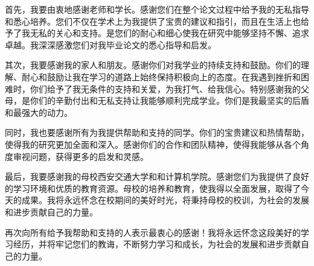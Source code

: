 \AcknowledgmentTitleCN

首先，我要由衷地感谢老师和学长。感谢您们在整个论文过程中给予我的无私指导和悉心培养。您们不仅在学术上为我提供了宝贵的建议和指引，而且在生活上也给予了我无私的关心和支持。是您们的耐心和细心使我在研究中能够坚持不懈、追求卓越。我深深感激您们对我毕业论文的悉心指导和启发。

其次，我要感谢我的家人和朋友。感谢你们对我学业的持续支持和鼓励。你们的理解、耐心和鼓励让我在学习的道路上始终保持积极向上的态度。在我遇到挫折和困难时，你们给予了我无条件的支持和关爱，为我打气、给我信心。特别感谢我的父母，是你们的辛勤付出和无私支持让我能够顺利完成学业。你们是我最坚实的后盾和最强大的动力。

同时，我也要感谢所有为我提供帮助和支持的同学。你们的宝贵建议和热情帮助，使得我的研究更加全面和深入。感谢你们的合作和团队精神，使得我能够从各个角度审视问题，获得更多的启发和灵感。

最后，我要感谢我的母校西安交通大学和和计算机学院。感谢您们为我提供了良好的学习环境和优质的教育资源。母校的培养和教育，使我得以全面发展，取得了今天的成果。我将永远怀念在校期间的美好时光，将秉持母校的校训，为社会的发展和进步贡献自己的力量。

再次向所有给予我帮助和支持的人表示最衷心的感谢！我将永远怀念这段美好的学习经历，并将牢记您们的教诲，不断努力学习和成长，为社会的发展和进步贡献自己的力量。